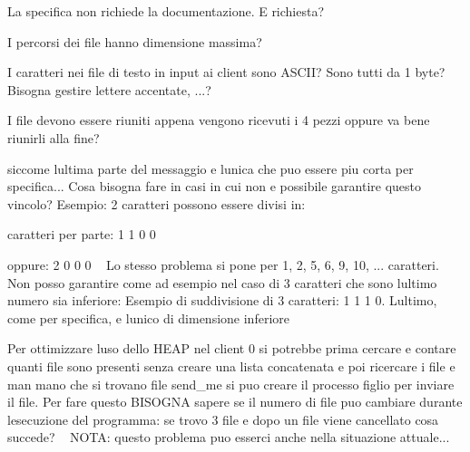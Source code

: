 
\begin{DoxyRefList}
\item[\label{warning__warning000001}%
\Hypertarget{warning__warning000001}%
File \hyperlink{client_8c}{client.c} ]La specifica non richiede la documentazione. E\textquotesingle{} richiesta?

I percorsi dei file hanno dimensione massima?

I caratteri nei file di testo in input ai client sono A\+S\+C\+II? Sono tutti da 1 byte? Bisogna gestire lettere accentate, ...?  
\item[\label{warning__warning000008}%
\Hypertarget{warning__warning000008}%
Globale \hyperlink{server_8c_a0ddf1224851353fc92bfbff6f499fa97}{main} (int argc, char $\ast$argv\mbox{[}\mbox{]})]I file devono essere riuniti appena vengono ricevuti i 4 pezzi oppure va bene riunirli alla fine?  
\item[\label{warning__warning000007}%
\Hypertarget{warning__warning000007}%
Globale \hyperlink{client_8h_a54b47b58f228d7bc9827d2919687e25a}{operazioni\+\_\+figlio} (char $\ast$file\+Path)]siccome l\textquotesingle{}ultima parte del messaggio e\textquotesingle{} l\textquotesingle{}unica che puo\textquotesingle{} essere piu\textquotesingle{} corta per specifica... Cosa bisogna fare in casi in cui non e\textquotesingle{} possibile garantire questo vincolo? Esempio\+: 2 caratteri possono essere divisi in\+:
\begin{DoxyItemize}
\item caratteri per parte\+: 1 1 0 0
\item oppure\+: 2 0 0 0 ~\newline
 Lo stesso problema si pone per 1, 2, 5, 6, 9, 10, ... caratteri. ~\newline
 Non posso garantire come ad esempio nel caso di 3 caratteri che sono l\textquotesingle{}ultimo numero sia inferiore\+: Esempio di suddivisione di 3 caratteri\+: 1 1 1 0. L\textquotesingle{}ultimo, come per specifica, e\textquotesingle{} l\textquotesingle{}unico di dimensione inferiore 
\end{DoxyItemize}
\item[\label{warning__warning000004}%
\Hypertarget{warning__warning000004}%
Globale \hyperlink{server_8c_a48d605ff689f470746c858648f0a98c2}{S\+I\+G\+I\+N\+T\+Signal\+Handler} (int sig)]Per ottimizzare l\textquotesingle{}uso dello H\+E\+AP nel client 0 si potrebbe prima cercare e contare quanti file sono presenti senza creare una lista concatenata e poi ricercare i file e man mano che si trovano file send\+\_\+me si puo\textquotesingle{} creare il processo figlio per inviare il file. Per fare questo B\+I\+S\+O\+G\+NA sapere se il numero di file puo\textquotesingle{} cambiare durante l\textquotesingle{}esecuzione del programma\+: se trovo 3 file e dopo un file viene cancellato cosa succede? ~\newline
 N\+O\+TA\+: questo problema puo\textquotesingle{} esserci anche nella situazione attuale...


\end{DoxyRefList}
